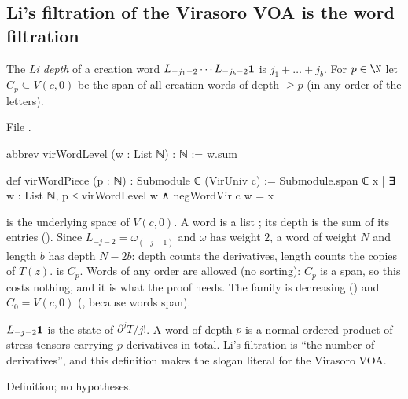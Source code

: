 \subsection{Li's filtration of the Virasoro VOA is the word filtration}

\begin{definition}\label{l20:def:virword}
The \emph{Li depth} of a creation word $L_{-j_1-2}\cdots L_{-j_b-2}\mathbf{1}$ is $j_1+\dots+j_b$. For $p\in\N$ let
$C_p\subseteq V(c,0)$ be the span of all creation words of depth $\ge p$ (in any order of the letters).
\end{definition}
\noindent File .
\begin{leancode}
abbrev virWordLevel (w : List ℕ) : ℕ := w.sum

def virWordPiece (p : ℕ) : Submodule ℂ (VirUniv c) :=
  Submodule.span ℂ {x | ∃ w : List ℕ, p ≤ virWordLevel w ∧ negWordVir c w = x}
\end{leancode}

\begin{dictionary}
 is the underlying space of $V(c,0)$. A word is a list ; its depth is the sum of its
entries (). Since $L_{-j-2}=\omega_{(-j-1)}$ and $\omega$ has weight $2$, a word of weight $N$ and length $b$
has depth $N-2b$: depth counts the derivatives, length counts the copies of $T(z)$.  is $C_p$.
Words of any order are allowed (no sorting): $C_p$ is a span, so this costs nothing, and it is what the proof needs.
The family is decreasing () and $C_0=V(c,0)$ (, because words
span).
\end{dictionary}

\begin{physics}
$L_{-j-2}\mathbf{1}$ is the state of $\partial^jT/j!$. A word of depth $p$ is a normal-ordered product of stress
tensors carrying $p$ derivatives in total. Li's filtration is ``the number of derivatives'', and this definition
makes the slogan literal for the Virasoro VOA.
\end{physics}

\begin{status}
Definition; no hypotheses.
\end{status}

